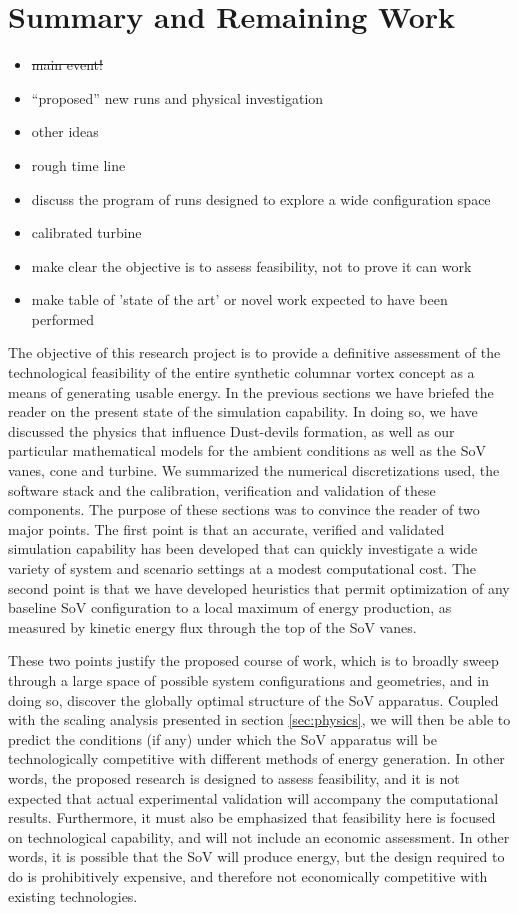 \section{Summary and Remaining Work}
\label{sec:future_work}

\begin{itemize}
\item \st{main event!}
\item ``proposed'' new runs and physical investigation
\item other ideas
\item rough time line
\item discuss the program of runs designed to explore a wide configuration space
\item calibrated turbine
\item make clear the objective is to assess feasibility, not to prove it can work
\item make table of 'state of the art' or novel work expected to have been performed
\end{itemize}

The objective of this research project is to provide a definitive assessment of the 
technological feasibility of the entire synthetic columnar vortex concept as a 
means of generating usable energy. In the 
previous sections we have briefed the reader on the present state of the simulation capability. 
In doing so, we have discussed the physics that influence 
Dust-devils formation, as well as our particular mathematical models for the ambient conditions 
as well as the SoV vanes, cone and turbine. We summarized the numerical discretizations used, the software stack 
and the calibration, verification and validation of these components. 
The purpose of these sections was to convince the reader of two major points. 
The first point is that an accurate, verified and validated simulation capability has been developed
that can quickly investigate a wide variety of system and scenario settings 
at a modest computational cost. 
The second point is that we have developed heuristics that permit optimization of any baseline SoV
configuration to a local maximum of energy production, as measured by kinetic energy flux 
through the top of the SoV vanes. 

These two points justify the proposed course of work, which is to
broadly sweep through a large space of possible system configurations and geometries, and in doing so, 
discover the globally optimal structure of the SoV apparatus. Coupled with the scaling analysis presented 
in section \ref{sec:physics}, we will then be able to predict the conditions (if any) under which the SoV 
apparatus will be technologically competitive with different methods of energy generation. In other words, 
the proposed research is designed to assess feasibility, and it is not expected that actual 
experimental validation will accompany the computational results. Furthermore, it must also be emphasized 
that feasibility here is focused on technological capability, and will not include an economic assessment. 
In other words, it is possible that the SoV will produce energy, but the design required to do is 
prohibitively expensive, and therefore not economically competitive with existing technologies.

